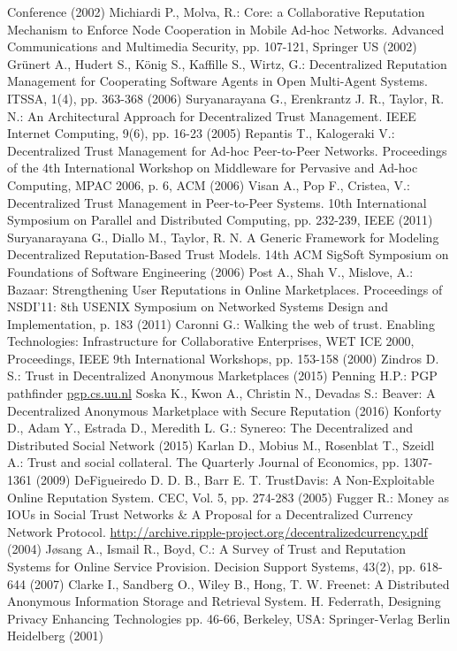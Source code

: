 \documentclass[11pt]{llncs}
\theoremstyle{definition}
\begin{document}
\begin{thebibliography}{40}
     Conference (2002)
     Michiardi P., Molva, R.: Core: a Collaborative Reputation Mechanism to Enforce Node Cooperation in Mobile Ad-hoc
     Networks. Advanced Communications and Multimedia Security, pp. 107-121, Springer US (2002)
     Grünert A., Hudert S., König S., Kaffille S., Wirtz, G.: Decentralized Reputation Management for Cooperating Software
     Agents in Open Multi-Agent Systems. ITSSA, 1(4), pp. 363-368 (2006)
     Suryanarayana G., Erenkrantz J. R., Taylor, R. N.: An Architectural Approach for Decentralized Trust Management. IEEE
     Internet Computing, 9(6), pp. 16-23 (2005)
     Repantis T., Kalogeraki V.: Decentralized Trust Management for Ad-hoc Peer-to-Peer Networks. Proceedings of the 4th
     International Workshop on Middleware for Pervasive and Ad-hoc Computing, MPAC 2006, p. 6, ACM (2006)
     Visan A., Pop F., Cristea, V.: Decentralized Trust Management in Peer-to-Peer Systems. 10th International Symposium on
     Parallel and Distributed Computing, pp. 232-239, IEEE (2011)
     Suryanarayana G., Diallo M., Taylor, R. N. A Generic Framework for Modeling Decentralized Reputation-Based Trust Models.
     14th ACM SigSoft Symposium on Foundations of Software Engineering (2006)
     Post A., Shah V., Mislove, A.: Bazaar: Strengthening User Reputations in Online Marketplaces. Proceedings of NSDI’11:
     8th USENIX Symposium on Networked Systems Design and Implementation, p. 183 (2011)
     Caronni G.: Walking the web of trust. Enabling Technologies: Infrastructure for Collaborative Enterprises, WET ICE 2000,
     Proceedings, IEEE 9th International Workshops, pp. 153-158 (2000)
     Zindros D. S.: Trust in Decentralized Anonymous Marketplaces (2015)
     Penning H.P.: PGP pathfinder \url{pgp.cs.uu.nl}
     Soska K., Kwon A., Christin N., Devadas S.: Beaver: A Decentralized Anonymous Marketplace with Secure Reputation (2016)
     Konforty D., Adam Y., Estrada D., Meredith L. G.: Synereo: The Decentralized and Distributed Social Network (2015)
     Karlan D., Mobius M., Rosenblat T., Szeidl A.: Trust and social collateral. The Quarterly Journal of Economics, pp.
     1307-1361 (2009)
     DeFigueiredo D. D. B., Barr E. T. TrustDavis: A Non-Exploitable Online Reputation System. CEC, Vol. 5, pp. 274-283
     (2005)
     Fugger R.: Money as IOUs in Social Trust Networks \& A Proposal for a Decentralized Currency Network Protocol.
     \url{http://archive.ripple-project.org/decentralizedcurrency.pdf} (2004)
     Jøsang A., Ismail R., Boyd, C.: A Survey of Trust and Reputation Systems for Online Service Provision. Decision
     Support Systems, 43(2), pp. 618-644 (2007)
     Clarke I., Sandberg O., Wiley B., Hong, T. W. Freenet: A Distributed Anonymous Information Storage and
     Retrieval System. H. Federrath, Designing Privacy Enhancing Technologies pp. 46-66, Berkeley, USA: Springer-Verlag
     Berlin Heidelberg (2001)
  \end{thebibliography}
\end{document}
